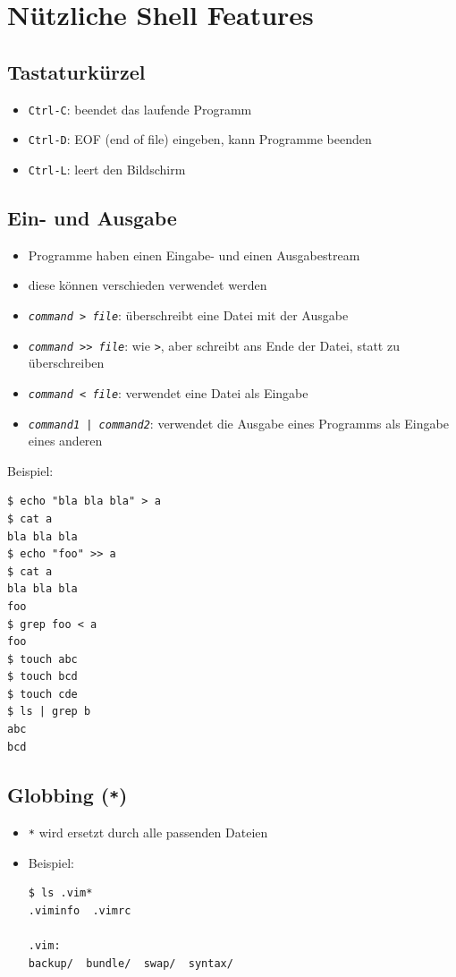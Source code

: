 \section{Nützliche Shell Features}
\subsection{Tastaturkürzel}
\begin{itemize}
  \item \texttt{Ctrl-C}: beendet das laufende Programm
  \item \texttt{Ctrl-D}: EOF (end of file) eingeben, kann Programme beenden
  \item \texttt{Ctrl-L}: leert den Bildschirm
\end{itemize}

\subsection{Ein- und Ausgabe}
\begin{itemize}
  \item Programme haben einen Eingabe- und einen Ausgabestream
  \item diese können verschieden verwendet werden
  \item \texttt{\textit{command} > \textit{file}}: überschreibt eine Datei mit der Ausgabe
  \item \texttt{\textit{command} >> \textit{file}}: wie \texttt{>}, aber schreibt ans Ende der Datei, statt zu überschreiben
  \item \texttt{\textit{command} < \textit{file}}: verwendet eine Datei als Eingabe
  \item \texttt{\textit{command1} | \textit{command2}}: verwendet die Ausgabe eines Programms als Eingabe eines anderen
\end{itemize}
Beispiel:
\begin{verbatim}
$ echo "bla bla bla" > a
$ cat a
bla bla bla
$ echo "foo" >> a
$ cat a
bla bla bla
foo
$ grep foo < a
foo
$ touch abc
$ touch bcd
$ touch cde
$ ls | grep b
abc
bcd
\end{verbatim}

\subsection{Globbing (\texttt{*})}
\begin{itemize}
  \item \texttt{*} wird ersetzt durch alle passenden Dateien
  \item Beispiel:
\begin{verbatim}
$ ls .vim*
.viminfo  .vimrc

.vim:
backup/  bundle/  swap/  syntax/
\end{verbatim}
\end{itemize}

